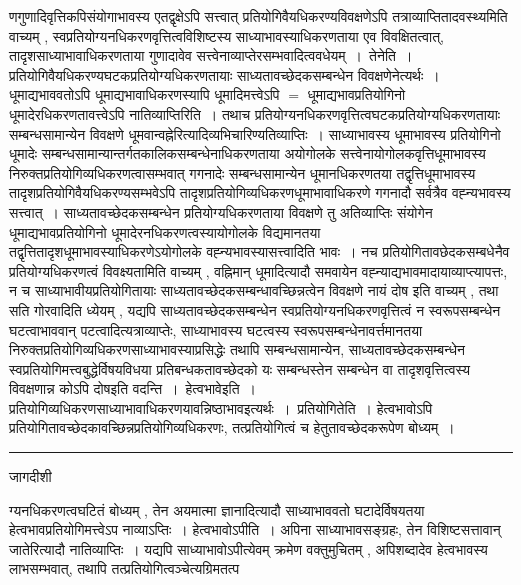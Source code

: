 \documentclass[10pt, openany]{book}
\begin{document}
{णगुणादिवृत्तिकपिसंयोगाभावस्य एतद्वृक्षेऽपि सत्त्वात् प्रतियोगिवैयधिकरण्यविवक्षणेऽपि तत्राव्याप्तितादवस्थ्यमिति वाच्यम् , स्वप्रतियोग्यनधिकरणवृत्तित्वविशिष्टस्य साध्याभावस्याधिकरणताया एव विवक्षितत्वात्, तादृशसाध्याभावाधिकरणताया गुणादावेव सत्त्वेनाव्याप्तेरसम्भवादित्ववधेयम्~।~{\la तेनेति~।}
प्रतियोगिवैयधिकरण्यघटकप्रतियोग्यधिकरणतायाः साध्यतावच्छेदकसम्बन्धेन विवक्षणेनेत्यर्थः~। धूमाद्यभाववतोऽपि धूमाद्यभावाधिकरणस्यापि धूमादिमत्त्वेऽपि $=$ धूमाद्यभावप्रतियोगिनो धूमादेरधिकरणतावत्त्वेऽपि {\la नातिव्याप्तिरिति~।} तथाच प्रतियोग्यनधिकरणवृत्तित्वघटकप्रतियोग्यधिकरणतायाः सम्बन्धसामान्येन विवक्षणे
धूमवान्वह्नेरित्यादिव्यभिचारिण्यतिव्याप्तिः~। साध्याभावस्य धूमाभावस्य प्रतियोगिनो धूमादेः सम्बन्धसामान्यान्तर्गतकालिकसम्बन्धेनाधिकरणताया अयोगोलके सत्त्वेनायोगोलकवृत्तिधूमाभावस्य निरुक्तप्रतियोगिव्यधिकरणत्वासम्भवात् गगनादेः सम्बन्धसामान्येन धूमानधिकरणतया तद्वृत्तिधूमाभावस्य तादृशप्रतियोगिवैयधिकरण्यसम्भवेऽपि तादृशप्रतियोगिव्यधिकरणधूमाभावाधिकरणे गगनादौ सर्वत्रैव वह्न्यभावस्य सत्त्वात्~। साध्यतावच्छेदकसम्बन्धेन
प्रतियोग्यधिकरणताया विवक्षणे तु अतिव्याप्तिः संयोगेन धूमाद्यभावप्रतियोगिनो धूमादेरनधिकरणत्वस्यायोगोलके विद्यमानतया तद्वृत्तितादृशधूमाभावस्याधिकरणेऽयोगोलके
वह्न्यभावस्यासत्त्वादिति भावः~। नच प्रतियोगितावछेदकसम्बधेनैव प्रतियोग्यधिकरणत्वं विवक्ष्यतामिति वाच्यम् , वह्निमान् धूमादित्यादौ समवायेन वह्न्याद्यभावमादायाव्याप्त्यापत्तः, न च साध्याभावीयप्रतियोगितायाः साध्यतावच्छेदकसम्बन्धावच्छिन्नत्वेन विवक्षणे नायं दोष इति वाच्यम् , तथा सति गोरवादिति ध्येयम् , यद्यपि साध्यतावच्छेदकसम्बन्धेन स्वप्रतियोग्यनधिकरणवृत्तित्वं न स्वरूपसम्बन्धेन घटत्वाभाववान् पटत्वादित्यत्राव्याप्तेः, साध्याभावस्य घटत्वस्य स्वरूपसम्बन्धेनावर्त्तमानतया निरुक्तप्रतियोगिव्यधिकरणसाध्याभावस्याप्रसिद्धेः तथापि सम्बन्धसामान्येन, साध्यतावच्छेदकसम्बन्धेन स्वप्रतियोगिमत्त्वबुद्धेर्विषयविधया प्रतिबन्धकतावच्छेदको यः सम्बन्धस्तेन
सम्बन्धेन वा तादृशवृत्तित्वस्य विवक्षणान्न कोऽपि दोषइति वदन्ति~।~{\la हेत्वभावेइति~।} प्रतियोगिव्यधिकरणसाध्याभावाधिकरणयावन्निष्ठाभावइत्यर्थः~।~{\la प्रतियोगितेति~।}
\newpage
{\la हेत्वभावोऽपि प्रतियोगितावच्छेदकावच्छिन्नप्रतियोगिव्यधिकरणः, तत्प्रतियोगित्वं च हेतुतावच्छेदकरूपेण बोध्यम्~।}\\
\hrule
\begin{center} जागदीशी \end{center}
ग्यनधिकरणत्वघटितं बोध्यम् , तेन अयमात्मा ज्ञानादित्यादौ साध्याभाववतो घटादेर्विषयतया हेत्वभावप्रतियोगिमत्त्वेऽप नाव्याऽप्तिः~। हेत्वभावोऽपीति~। अपिना साध्याभावसङ्ग्रहः, तेन विशिष्टसत्तावान् जातेरित्यादौ नातिव्याप्तिः~। यद्यपि साध्याभावोऽपीत्येवम् क्रमेण वक्तुमुचितम् , अपिशब्दादेव हेत्वभावस्य लाभसम्भवात्, तथापि तत्प्रतियोगित्वञ्चेत्यग्रिमतत्प
}
\end{document}
